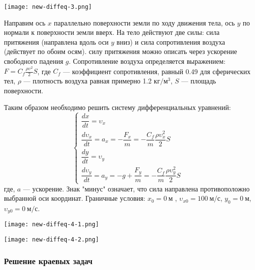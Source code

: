 \begin{center}
	\texttt{[image: new-diffeq-3.png]}
\end{center}



Направим ось $x$ параллельно поверхности земли по ходу движения тела, ось $y$ по нормали к поверхности земли вверх. На тело действуют две силы: сила притяжения (направлена вдоль оси $y$ вниз) и сила сопротивления воздуха (действует по обоим осям). силу притяжения можно описать через ускорение свободного падения $g$. Сопротивление воздуха определяется выражением: $F=C_f \frac{\rho \upsilon^2}{2} S$, где $C_f$ --- коэффициент сопротивления, равный 0.49 для сферических тел, $\rho$ --- плотность воздуха равная примерно 1.2 $кг/м^3$, $S$ --- площадь поверхности.

Таким образом необходимо решить систему дифференциальных уравнений:
\begin{equation*}
\begin{cases}
\dfrac{dx}{dt}=\upsilon_x  \\
\dfrac{d \upsilon_x}{dt} = a_x = -\dfrac{F_x}{m}=-\dfrac{C_f}{m} \dfrac{\rho \upsilon_x^2}{2}S \\
\dfrac{dy}{dt}=\upsilon_y  \\
\dfrac{d \upsilon_y}{dt} = a_y = -g+\dfrac{F_y}{m}=-\dfrac{C_f}{m} \dfrac{\rho \upsilon_y^2}{2}S
\end{cases}
\end{equation*}
где, $a$ --- ускорение. Знак "минус" означает, что сила направлена противоположно выбранной оси координат. Граничные условия: $x_0=0~м$ , $\upsilon_{x0}=100~м/с$, $y_0=0~ м$, $\upsilon_{y0}=0~ м/с$.

\begin{center}
	\texttt{[image: new-diffeq-4-1.png]}
\end{center}
\begin{center}
	\texttt{[image: new-diffeq-4-2.png]}
\end{center}
\subsubsection*{Решение краевых задач}

